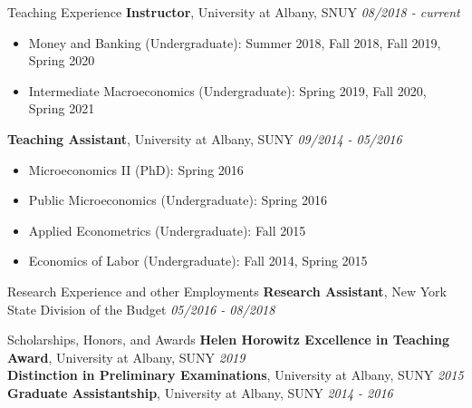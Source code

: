 \documentclass{resume_liang} %
\begin{document}
\begin{rSection}{Teaching Experience}
{\bf Instructor}{, University at Albany, SNUY} \hfill {\em 08/2018 - current}
 \begin{itemize}
     \item[] Money and Banking (Undergraduate): Summer 2018, Fall 2018, Fall 2019, Spring 2020
     \item[] Intermediate Macroeconomics (Undergraduate): Spring 2019, Fall 2020, Spring 2021
 \end{itemize} 
{\bf Teaching Assistant}{, University at Albany, SUNY} \hfill {\em 09/2014 - 05/2016}
   \begin{itemize}
     \item[] Microeconomics II (PhD): Spring 2016
     \item[] Public Microeconomics (Undergraduate): Spring 2016
     \item[] Applied Econometrics (Undergraduate): Fall 2015
     \item[] Economics of Labor (Undergraduate): Fall 2014, Spring 2015
   \end{itemize} 
\end{rSection}
\bigskip \bigskip





\begin{rSection}{Research Experience and other Employments}
	{\bf Research Assistant}{, New York State Division of the Budget} \hfill {\em 05/2016 - 08/2018}
\end{rSection}
\bigskip \bigskip






\begin{rSection}{Scholarships, Honors, and Awards} 
{\bf Helen Horowitz Excellence in Teaching Award}{, University at Albany, SUNY} \hfill{\em 2019}  \\ 
{\bf Distinction in Preliminary Examinations}{, University at Albany, SUNY} \hfill{\em 2015}  \\
{\bf Graduate Assistantship}{, University at Albany, SUNY} \hfill{\em 2014 - 2016}  \\
\end{rSection}
\bigskip \bigskip
\end{document}

